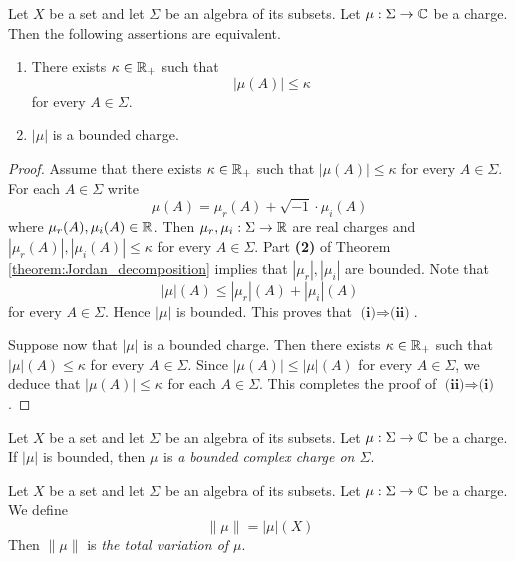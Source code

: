 \begin{theorem}\label{theorem:charge_is_bounded_if_variation_is_finite}
    Let $X$ be a set and let $\Sigma$ be an algebra of its subsets. Let $\mu:\Sigma \rightarrow {\mathbb C}$ be a charge. Then the following assertions are equivalent.
    \begin{enumerate}[label=\emph{\textbf{(\roman*)}}, leftmargin=*]
        \item There exists $\kappa \in {\mathbb R}_+$ such that
              $$|\mu(A)|\leq \kappa$$
              for every $A \in \Sigma$.
        \item $|\mu|$ is a bounded charge.
    \end{enumerate}
\end{theorem}
\begin{proof}
    Assume that there exists $\kappa \in {\mathbb R}_+$ such that $|\mu(A)| \leq \kappa$ for every $A \in \Sigma$. For each $A \in \Sigma$ write
    $$\mu(A) = \mu_r(A) + \sqrt{-1}\cdot \mu_i(A)$$
    where $\mu_r(A),\mu_i(A) \in {\mathbb R}$. Then $\mu_r,\mu_i:\Sigma \rightarrow {\mathbb R}$ are real charges and $|\mu_r(A)|,|\mu_i(A)| \leq \kappa$ for every $A \in \Sigma$. Part \textbf{(2)} of Theorem \ref{theorem:Jordan_decomposition} implies that $|\mu_r|,|\mu_i|$ are bounded. Note that
    $$|\mu|(A) \leq |\mu_r|(A) + |\mu_i|(A)$$
    for every $A \in \Sigma$. Hence $|\mu|$ is bounded. This proves that $\textbf{(i)}\Rightarrow \textbf{(ii)}$.

    Suppose now that $|\mu|$ is a bounded charge. Then there exists $\kappa \in {\mathbb R}_+$ such that $|\mu|(A) \leq \kappa$ for every $A \in \Sigma$. Since $|\mu(A)| \leq |\mu|(A)$ for every $A \in \Sigma$, we deduce that $|\mu(A)|\leq \kappa$ for each $A \in \Sigma$. This completes the proof of $\textbf{(ii)}\Rightarrow \textbf{(i)}$.
\end{proof}

\begin{definition}
    Let $X$ be a set and let $\Sigma$ be an algebra of its subsets. Let $\mu:\Sigma \rightarrow {\mathbb C}$ be a charge. If $|\mu|$ is bounded, then $\mu$ is \textit{a bounded complex charge on $\Sigma$}.
\end{definition}

\begin{definition}
    Let $X$ be a set and let $\Sigma$ be an algebra of its subsets. Let $\mu:\Sigma \rightarrow {\mathbb C}$ be a charge. We define
    $$\lVert \mu \rVert = |\mu|(X)$$
    Then $\lVert \mu \rVert$ is \textit{the total variation of $\mu$}.
\end{definition}

